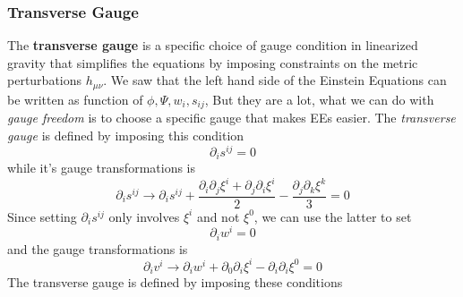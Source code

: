 \subsubsection{Transverse Gauge}

The \textbf{transverse gauge} is a specific choice of gauge condition in linearized gravity that simplifies the equations by imposing constraints on the metric perturbations $h_{\mu \nu }$. 
We saw that the left hand side of the Einstein Equations can be written as function of $\phi ,\Psi ,w_{i},s_{ij}$, But they are a lot, what we can do with \emph{gauge freedom} is to choose a specific gauge that makes EEs easier. The \emph{transverse gauge }is defined by imposing this condition
\[
\partial_{i}s^{ij} = 0	
\]
while it's gauge transformations is 
\[
\partial_{i} s^{ij} \to \partial_{i}s^{ij} + \frac{\partial_{i}\partial_{j}\xi ^{i}+\partial_{j}\partial_{i}\xi ^{i}}{2} - \frac{\partial_{j}\partial_{k}\xi ^{k}}{3} = 0
\]
Since setting $\partial_{i}s^{ij}$ only involves $\xi ^{i}$ and not $\xi ^{0}$, we can use the latter to set
\[
\partial_{i}w^{i} = 0 
\]
and the gauge transformations is
\[
\partial_{i}v^{i} \to \partial_{i}w^{i}+ \partial_{0}\partial_{i}\xi ^{i} - \partial_{i}\partial_{i}\xi ^{0} = 0
\]
The transverse gauge is defined by imposing these conditions

